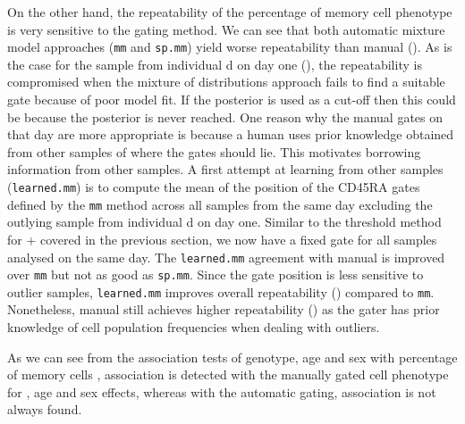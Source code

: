 On the other hand, the repeatability of the percentage of memory cell phenotype is very sensitive to the gating method.
We can see that both automatic mixture model approaches (\texttt{mm} and \texttt{sp.mm}) yield worse repeatability than manual ().
As is the case for the sample from individual d on day one (),
the repeatability is compromised when the mixture of distributions approach fails to find a suitable gate because of poor model fit.
If the posterior is used as a cut-off then this could be because the posterior is never reached.
One reason why the manual gates on that day are more appropriate is because a human uses prior knowledge obtained from other samples of where the gates should lie.
This motivates borrowing information from other samples.
A first attempt at learning from other samples (\texttt{learned.mm}) is to compute the mean of the position of the CD45RA gates defined by the \texttt{mm}
method across all samples from the same day excluding the outlying sample from individual d on day one.
Similar to the threshold method for + covered in the previous section, we now have a fixed gate for all samples analysed on the same day.
The \texttt{learned.mm} agreement with manual is improved over \texttt{mm} but not as good as \texttt{sp.mm}.
Since the gate position is less sensitive to outlier samples, \texttt{learned.mm} improves overall repeatability () compared to
\texttt{mm}.
Nonetheless, manual still achieves higher repeatability () as
the gater has prior knowledge of cell population frequencies when dealing with outliers.

As we can see from the association tests of genotype, age and sex with percentage of memory cells ,
association is detected with the manually gated cell phenotype for , age and sex effects,
whereas with the automatic gating, association is not always found.

